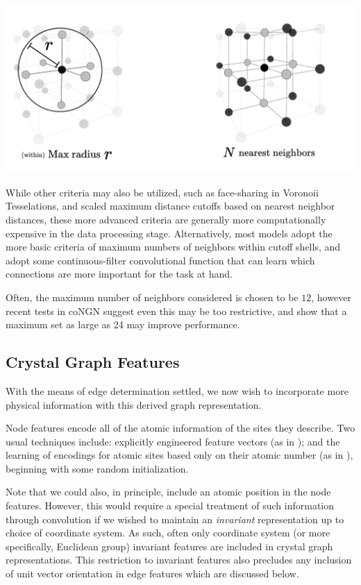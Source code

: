 \documentclass[10pt,a4paper]{article}
\begin{document}
\begin{center}
\includegraphics[scale=0.45]{ex_bondcriteria.pdf}
\end{center}
While other criteria may also be utilized, such as face-sharing in Voronoii Tesselations, and scaled maximum distance cutoffs based on nearest neighbor distances, these more advanced criteria are generally more computationally expensive in the data processing stage. Alternatively, most models \cite{cgcnn,alignn,megnet} adopt the more basic criteria of maximum numbers of neighbors within cutoff shells, and adopt some continuous-filter convolutional function that can learn which connections are more important for the task at hand.

Often, the maximum number of neighbors considered is chosen to be $12$, however recent tests in coNGN \cite{congn} suggest even this may be too restrictive, and show that a maximum set as large as 24 may improve performance.



\subsection{Crystal Graph Features}
With the means of edge determination settled, we now wish to incorporate more physical information with this derived graph representation. 


Node features encode all of the atomic information of the sites they describe. Two usual techniques include: explicitly engineered feature vectors (as in \cite{cgcnn}); and the learning of encodings for atomic sites based only on their atomic number (as in \cite{megnet}), beginning with some random initialization.


Note that we could also, in principle, include an atomic position in the node features. However, this would require a special treatment of such information through convolution if we wished to maintain an \textit{invariant} representation up to choice of coordinate system. As such, often only coordinate system (or more specifically, Euclidean group) invariant features are included in crystal graph representations. This restriction to invariant features also precludes any inclusion of unit vector orientation in edge features which are discussed below.
\end{document}
